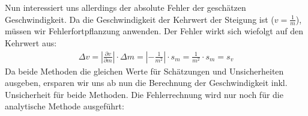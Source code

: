 \documentclass[letterpaper,10pt,english]{jupyterBook}
\begin{document}
\sphinxAtStartPar
Nun interessiert uns allerdings der absolute Fehler der geschätzen Geschwindigkeit. Da die Geschwindigkeit der Kehrwert der Steigung ist (\(v = \frac{1}{m}\)), müssen wir Fehlerfortpflanzung anwenden. Der Fehler wirkt sich wiefolgt auf den Kehrwert aus:
\begin{equation*}
\begin{split}\Delta v = \left|\frac{\partial v}{\partial m}\right|\cdot \Delta m = \left| -\frac{1}{m^2} \right| \cdot s_m = \frac{1}{m^2} \cdot s_m = s_v\end{split}
\end{equation*}
\sphinxAtStartPar
Da beide Methoden die gleichen Werte für Schätzungen und Unsicherheiten ausgeben, ersparen wir uns ab nun die Berechnung der Geschwindigkeit inkl. Unsicherheit für beide Methoden. Die Fehlerrechnung wird nur noch für die analytische Methode ausgeführt:
\end{document}
